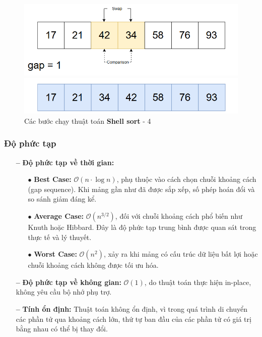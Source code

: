 \begin{figure}[H]
    \includegraphics[width=0.5\linewidth]{img/shell_sort/24.png}
    \vspace{0.15cm}

    \includegraphics[width=0.5\linewidth]{img/shell_sort/25.png}
    \caption{Các bước chạy thuật toán \textbf{Shell sort} - 4}
\end{figure}


\subsubsection{Độ phức tạp}
\begin{itemize}
    \item[\textbf{--}] \textbf{Độ phức tạp về thời gian:}
    \begin{itemize}
        \item[$\bullet$] \textbf{Best Case:} $\mathcal{O}(n \cdot \log n)$, phụ thuộc vào cách chọn chuỗi khoảng cách (gap sequence). Khi mảng gần như đã được sắp xếp, số phép hoán đổi và so sánh giảm đáng kể.\cite{vishweshwarayya975find}
        \item[$\bullet$] \textbf{Average Case:} $\mathcal{O}(n^{3/2})$, đối với chuỗi khoảng cách phổ biến như Knuth hoặc Hibbard. Đây là độ phức tạp trung bình được quan sát trong thực tế và lý thuyết.\cite{jiang1999average}
        \item[$\bullet$] \textbf{Worst Case:} $\mathcal{O}(n^2)$, xảy ra khi mảng có cấu trúc dữ liệu bất lợi hoặc chuỗi khoảng cách không được tối ưu hóa.\cite{vishweshwarayya975find}
    \end{itemize}
    \item[\textbf{--}] \textbf{Độ phức tạp về không gian:} $\mathcal{O}(1)$, do thuật toán thực hiện in-place, không yêu cầu bộ nhớ phụ trợ.
    \item[\textbf{--}] \textbf{Tính ổn định:} Thuật toán không ổn định, vì trong quá trình di chuyển các phần tử qua khoảng cách lớn, thứ tự ban đầu của các phần tử có giá trị bằng nhau có thể bị thay đổi.
\end{itemize}
